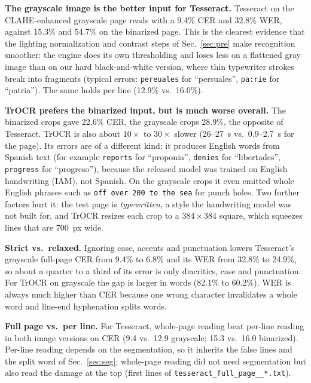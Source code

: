 \documentclass[10pt,twocolumn]{article}
\begin{document}
\textbf{The grayscale image is the better input for Tesseract.} Tesseract on the CLAHE-enhanced grayscale page reads with a 9.4\% CER and 32.8\% WER, against 15.3\% and 54.7\% on the binarized page. This is the clearest evidence that the lighting normalization and contrast steps of Sec.~\ref{sec:pre} make recognition smoother: the engine does its own thresholding and loses less on a flattened gray image than on our hard black-and-white version, where thin typewriter strokes break into fragments (typical errors: \texttt{pereuales} for ``persuales'', \texttt{pa:rie} for ``patria''). The same holds per line (12.9\% vs.\ 16.0\%).

\textbf{TrOCR prefers the binarized input, but is much worse overall.} The binarized crops gave 22.6\% CER, the grayscale crops 28.9\%, the opposite of Tesseract. TrOCR is also about $10\times$ to $30\times$ slower (26--27~s vs.\ 0.9--2.7~s for the page). Its errors are of a different kind: it produces English words from Spanish text (for example \texttt{reports} for ``proponia'', \texttt{denies} for ``libertades'', \texttt{progress} for ``progreso''), because the released model was trained on English handwriting (IAM), not Spanish. On the grayscale crops it even emitted whole English phrases such as \texttt{off over 200 to the sea} for punch holes. Two further factors hurt it: the test page is \emph{typewritten}, a style the handwriting model was not built for, and TrOCR resizes each crop to a $384\times384$ square, which squeezes lines that are 700~px wide.

\textbf{Strict vs.\ relaxed.} Ignoring case, accents and punctuation lowers Tesseract's grayscale full-page CER from 9.4\% to 6.8\% and its WER from 32.8\% to 24.9\%, so about a quarter to a third of its error is only diacritics, case and punctuation. For TrOCR on grayscale the gap is larger in words (82.1\% to 60.2\%). WER is always much higher than CER because one wrong character invalidates a whole word and line-end hyphenation splits words.

\textbf{Full page vs.\ per line.} For Tesseract, whole-page reading beat per-line reading in both image versions on CER (9.4 vs.\ 12.9 grayscale; 15.3 vs.\ 16.0 binarized). Per-line reading depends on the segmentation, so it inherits the false lines and the split word of Sec.~\ref{sec:seg}; whole-page reading did not need segmentation but also read the damage at the top (first lines of \texttt{tesseract\_\allowbreak{}full\_\allowbreak{}page\_\allowbreak{}\_\allowbreak{}*.txt}).
\end{document}
